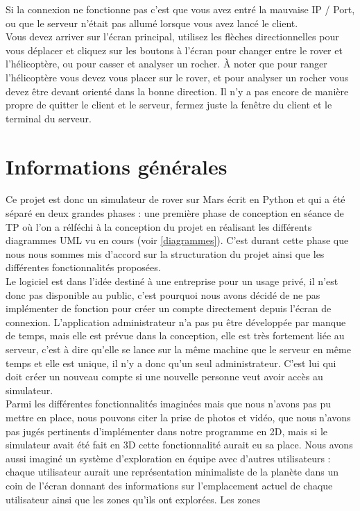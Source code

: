 \documentclass[12pt,a4paper]{scrartcl}
\begin{document}
Si la connexion ne fonctionne pas c'est que vous avez entré la mauvaise IP / Port, ou que le serveur n'était pas allumé lorsque vous avez lancé le client.\\
Vous devez arriver sur l'écran principal, utilisez les flèches directionnelles pour vous déplacer et cliquez sur les boutons à l'écran pour 
changer entre le rover et l'hélicoptère, ou pour casser et analyser un rocher. À noter que pour ranger l'hélicoptère vous devez vous placer sur le rover, et pour 
analyser un rocher vous devez être devant orienté dans la bonne direction. Il n'y a pas encore de manière propre de quitter le client et le serveur, fermez juste la fenêtre
du client et le terminal du serveur.

\section{Informations générales}
Ce projet est donc un simulateur de rover sur Mars écrit en Python et qui a été séparé en deux grandes phases : 
une première phase de conception en séance de TP où l'on a rélféchi à la conception du projet en réalisant
les différents diagrammes UML vu en cours (voir \ref{diagrammes}). C'est durant cette phase que nous nous sommes mis d'accord
sur la structuration du projet ainsi que les différentes fonctionnalités proposées.\\
Le logiciel est dans l'idée destiné à une entreprise pour un usage privé, il n'est donc pas disponible
au public, c'est pourquoi nous avons décidé de ne pas implémenter de fonction pour créer un compte directement depuis
l'écran de connexion. L'application administrateur n'a pas pu être développée par manque de temps, mais elle est prévue
dans la conception, elle est très fortement liée au serveur, c'est à dire qu'elle se lance sur la même machine que le serveur
en même temps et elle est unique, il n'y a donc qu'un seul administrateur. C'est lui qui doit créer un nouveau compte si une nouvelle
personne veut avoir accès au simulateur.\\
Parmi les différentes fonctionnalités imaginées mais que nous n'avons pas pu mettre en place, nous pouvons citer
la prise de photos et vidéo, que nous n'avons pas jugés pertinents d'implémenter dans notre programme en 2D, mais si 
le simulateur avait été fait en 3D cette fonctionnalité aurait eu sa place. Nous avons aussi imaginé un système d'exploration
en équipe avec d'autres utilisateurs : chaque utilisateur aurait une représentation minimaliste de la planète dans un coin de l'écran
donnant des informations sur l'emplacement actuel de chaque utilisateur ainsi que les zones qu'ils ont explorées. Les zones
\end{document}
